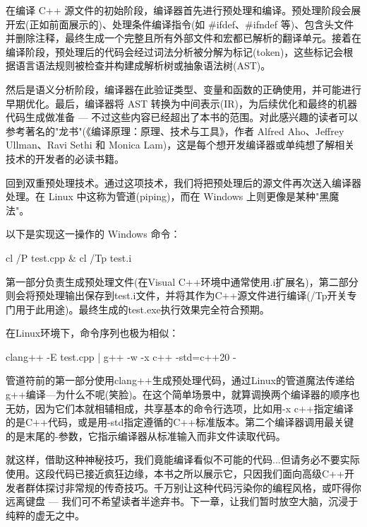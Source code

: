 在编译 C++ 源文件的初始阶段，编译器首先进行预处理和编译。预处理阶段会展开宏(正如前面展示的)、处理条件编译指令(如 \#ifdef、\#ifndef 等)、包含头文件并删除注释，最终生成一个完整且所有外部文件和宏都已解析的翻译单元。接着在编译阶段，预处理后的代码会经过词法分析被分解为标记(token)，这些标记会根据语言语法规则被检查并构建成解析树或抽象语法树(AST)。

然后是语义分析阶段，编译器在此验证类型、变量和函数的正确使用，并可能进行早期优化。最后，编译器将 AST 转换为中间表示(IR)，为后续优化和最终的机器代码生成做准备 --- 不过这些内容已经超出了本书的范围。对此感兴趣的读者可以参考著名的"龙书"(《编译原理：原理、技术与工具》，作者 Alfred Aho、Jeffrey Ullman、Ravi Sethi 和 Monica Lam)，这是每个想开发编译器或单纯想了解相关技术的开发者的必读书籍。

回到双重预处理技术。通过这项技术，我们将把预处理后的源文件再次送入编译器处理。在 Linux 中这称为管道(piping)，而在 Windows 上则更像是某种"黑魔法"。

以下是实现这一操作的 Windows 命令：

\begin{shell}
cl /P test.cpp & cl /Tp test.i
\end{shell}

第一部分负责生成预处理文件(在Visual C++环境中通常使用.i扩展名)，第二部分则会将预处理输出保存到test.i文件，并将其作为C++源文件进行编译(/Tp开关专门用于此用途)。最终生成的test.exe执行效果完全符合预期。

在Linux环境下，命令序列也极为相似：

\begin{shell}
clang++ -E test.cpp | g++ -w -x c++ -std=c++20 -
\end{shell}

管道符前的第一部分使用clang++生成预处理代码，通过Linux的管道魔法传递给g++编译---为什么不呢(笑脸)。在这个简单场景中，就算调换两个编译器的顺序也无妨，因为它们本就相辅相成，共享基本的命令行选项，比如用-x c++指定编译的是C++代码，或是用-std指定遵循的C++标准版本。第二个编译器调用最关键的是末尾的-参数，它指示编译器从标准输入而非文件读取代码。

就这样，借助这种神秘技巧，我们竟能编译看似不可能的代码...但请务必不要实际使用。这段代码已接近疯狂边缘，本书之所以展示它，只因我们面向高级C++开发者群体探讨非常规的传奇技巧。千万别让这种代码污染你的编程风格，或吓得你远离键盘 --- 我们可不希望读者半途弃书。下一章，让我们暂时放空大脑，沉浸于纯粹的虚无之中。














